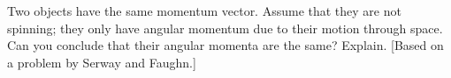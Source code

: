 Two objects have the same momentum vector. Assume that
they are not spinning; they only have angular momentum due
to their motion through space. Can you conclude that their
angular momenta are the same? Explain. [Based on a problem
by Serway and Faughn.]
